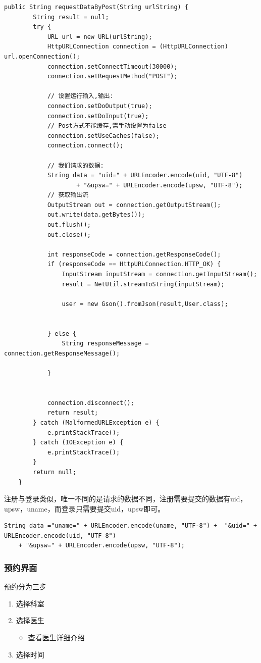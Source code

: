 \documentclass[UTF8,12pt]{article}
\begin{document}
\begin{lstlisting}[frame=shadowbox]
    public String requestDataByPost(String urlString) {
        String result = null;
        try {
            URL url = new URL(urlString);
            HttpURLConnection connection = (HttpURLConnection) url.openConnection();
            connection.setConnectTimeout(30000);
            connection.setRequestMethod("POST");

            // 设置运行输入,输出:
            connection.setDoOutput(true);
            connection.setDoInput(true);
            // Post方式不能缓存,需手动设置为false
            connection.setUseCaches(false);
            connection.connect();

            // 我们请求的数据:
            String data = "uid=" + URLEncoder.encode(uid, "UTF-8")
                    + "&upsw=" + URLEncoder.encode(upsw, "UTF-8");
            // 获取输出流
            OutputStream out = connection.getOutputStream();
            out.write(data.getBytes());
            out.flush();
            out.close();

            int responseCode = connection.getResponseCode();
            if (responseCode == HttpURLConnection.HTTP_OK) {
                InputStream inputStream = connection.getInputStream();
                result = NetUtil.streamToString(inputStream);

                user = new Gson().fromJson(result,User.class);


            } else {
                String responseMessage = connection.getResponseMessage();

            }


            connection.disconnect();
            return result;
        } catch (MalformedURLException e) {
            e.printStackTrace();
        } catch (IOException e) {
            e.printStackTrace();
        }
        return null;
    }
\end{lstlisting}

注册与登录类似，唯一不同的是请求的数据不同，注册需要提交的数据有uid，upsw，uname，而登录只需要提交uid，upsw即可。

\begin{lstlisting}[frame=shadowbox]
    String data ="uname=" + URLEncoder.encode(uname, "UTF-8") +  "&uid=" + URLEncoder.encode(uid, "UTF-8")
    + "&upsw=" + URLEncoder.encode(upsw, "UTF-8");
\end{lstlisting}

\subsubsection{预约界面}
预约分为三步
\begin{enumerate}
    \item 选择科室
    \item 选择医生
    \begin{itemize}
        \item 查看医生详细介绍
    \end{itemize}
    \item 选择时间
\end{enumerate}
\end{document}

